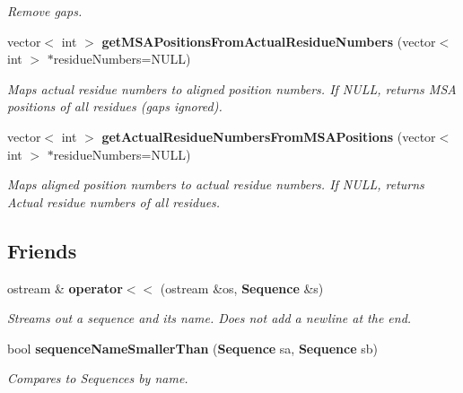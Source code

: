 \begin{CompactItemize}
\begin{CompactList}\small\item\em Remove gaps. \item\end{CompactList}\item 
vector$<$ int $>$ {\bf get\-MSAPositions\-From\-Actual\-Residue\-Numbers} (vector$<$ int $>$ $\ast$residue\-Numbers=NULL)\label{classSequence_a21}

\begin{CompactList}\small\item\em Maps actual residue numbers to aligned position numbers. If NULL, returns MSA positions of all residues (gaps ignored). \item\end{CompactList}\item 
vector$<$ int $>$ {\bf get\-Actual\-Residue\-Numbers\-From\-MSAPositions} (vector$<$ int $>$ $\ast$residue\-Numbers=NULL)\label{classSequence_a22}

\begin{CompactList}\small\item\em Maps aligned position numbers to actual residue numbers. If NULL, returns Actual residue numbers of all residues. \item\end{CompactList}\end{CompactItemize}
\subsection*{Friends}
\begin{CompactItemize}
\item 
ostream \& {\bf operator$<$$<$} (ostream \&os, {\bf Sequence} \&s)\label{classSequence_n0}

\begin{CompactList}\small\item\em Streams out a sequence and its name. Does not add a newline at the end. \item\end{CompactList}\item 
bool {\bf sequence\-Name\-Smaller\-Than} ({\bf Sequence} sa, {\bf Sequence} sb)\label{classSequence_n1}

\begin{CompactList}\small\item\em Compares to Sequences by name. \item\end{CompactList}\end{CompactItemize}


